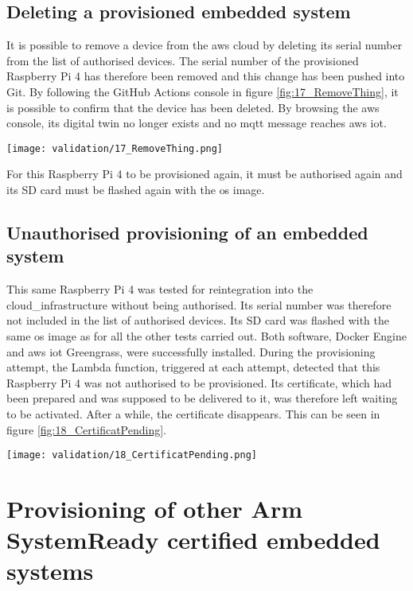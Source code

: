 \subsection{Deleting a provisioned embedded system}
It is possible to remove a device from the \gls{aws} \gls{cloud} by deleting its serial number from the list of authorised devices. The serial number of the provisioned Raspberry Pi 4 has therefore been removed and this change has been pushed into Git. By following the GitHub Actions console in figure \ref{fig:17_RemoveThing}, it is possible to confirm that the device has been deleted. By browsing the \gls{aws} console, its digital twin no longer exists and no \acrshort{mqtt} message reaches \gls{aws} \acrshort{iot}.
\begin{center}
    \begingroup
    \texttt{[image: validation/17\_RemoveThing.png]}
    \label{fig:17_RemoveThing}
    \endgroup
\end{center}
For this Raspberry Pi 4 to be provisioned again, it must be authorised again and its SD card must be flashed again with the \acrshort{os} image.

\subsection{Unauthorised provisioning of an embedded system}
This same Raspberry Pi 4 was tested for reintegration into the \gls{cloud_infrastructure} without being authorised. Its serial number was therefore not included in the list of authorised devices. Its SD card was flashed with the same \acrshort{os} image as for all the other tests carried out. Both software, Docker Engine and \gls{aws} \acrshort{iot} Greengrass, were successfully installed. During the provisioning attempt, the Lambda function, triggered at each attempt, detected that this Raspberry Pi 4 was not authorised to be provisioned. Its certificate, which had been prepared and was supposed to be delivered to it, was therefore left waiting to be activated. After a while, the certificate disappears. This can be seen in figure \ref{fig:18_CertificatPending}.
\begin{center}
    \begingroup
    \texttt{[image: validation/18\_CertificatPending.png]}
    \label{fig:18_CertificatPending}
    \endgroup
\end{center}

\section{Provisioning of other Arm SystemReady certified embedded systems}

